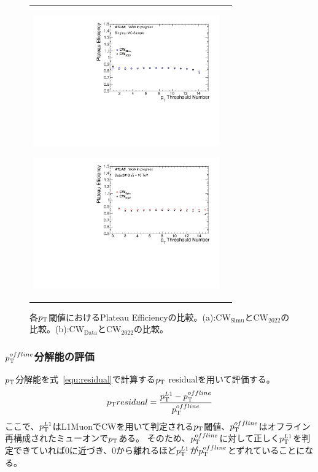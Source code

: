 \begin{figure}
    \begin{tabular}{cc}
    \centering
    \begin{minipage}[b]{0.45\hsize}%
        \centering
        \hspace*{-1.5cm}
        \includegraphics[clip, width=8cm]{fig/5/v05vsv07_Plateau_re.pdf}
        \subcaption{}
        \label{fig:Plateau_v07v05}
    \end{minipage}%
    \begin{minipage}[b]{0.7\hsize}%
        \centering
        \hspace*{-0.75cm}
        \includegraphics[clip, width=8cm]{fig/5/v05vsv06_Plateau_re.pdf}
        \subcaption{}
        \label{fig:Plateau_v06v05}
    \end{minipage}%
    \end{tabular}
    \caption{各$p_{\rm{T}}$閾値におけるPlateau Efficiencyの比較。(a):$\mathrm{CW_{Simu}}$と$\mathrm{CW_{2022}}$の比較。(b):$\mathrm{CW_{Data}}$と$\mathrm{CW_{2022}}$の比較。}
    \label{fig:Resolution_v07v06v05}
\end{figure}

\subsubsection{$p_{\rm{T}}^{offline}$分解能の評価}\label{分解能の評価}
$p_{\rm{T}}$分解能を式~\eqref{equ:residual}で計算する$p_{\rm{T}}$ residualを用いて評価する。
\begin{equation}
    p_{\rm{T}} residual = \frac{p_{\rm{T}}^{L1}-p_{\rm{T}}^{offline}}{p_{\rm{T}}^{offline}}
    \label{equ:residual}
\end{equation}
ここで、$p_{\rm{T}}^{L1}$はL1MuonでCWを用いて判定される$p_{\rm{T}}$閾値、$p_{\rm{T}}^{offline}$はオフライン再構成されたミューオンで$p_{\rm{T}}$ある。
そのため、$p_{\rm{T}}^{offline}$に対して正しく$p_{\rm{T}}^{L1}$を判定できていれば0に近づき、0から離れるほど$p_{\rm{T}}^{L1}$が$p_{\rm{T}}^{offline}$とずれていることになる。

